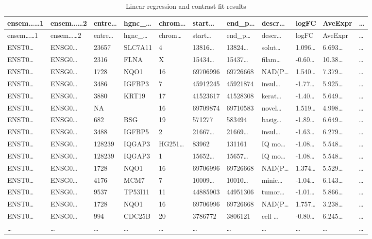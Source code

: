 \documentclass[
]{article}
\begin{document}
\begin{longtable}[]{@{}lllllllllll@{}}
\caption{\label{tab:linear-regression-and-contrast-fit-results}Linear regression and contrast fit results}\tabularnewline
\toprule
ensem\ldots\ldots1 & ensem\ldots\ldots2 & entre\ldots{} & hgnc\_\ldots{} & chrom\ldots{} & start\ldots{} & end\_p\ldots{} & descr\ldots{} & logFC & AveExpr & \ldots{}\tabularnewline
\midrule
\endfirsthead
\toprule
ensem\ldots\ldots1 & ensem\ldots\ldots2 & entre\ldots{} & hgnc\_\ldots{} & chrom\ldots{} & start\ldots{} & end\_p\ldots{} & descr\ldots{} & logFC & AveExpr & \ldots{}\tabularnewline
\midrule
\endhead
ENST0\ldots{} & ENSG0\ldots{} & 23657 & SLC7A11 & 4 & 13816\ldots{} & 13824\ldots{} & solut\ldots{} & 1.096\ldots{} & 6.693\ldots{} & \ldots{}\tabularnewline
ENST0\ldots{} & ENSG0\ldots{} & 2316 & FLNA & X & 15434\ldots{} & 15437\ldots{} & filam\ldots{} & -0.60\ldots{} & 10.38\ldots{} & \ldots{}\tabularnewline
ENST0\ldots{} & ENSG0\ldots{} & 1728 & NQO1 & 16 & 69706996 & 69726668 & NAD(P\ldots{} & 1.540\ldots{} & 7.379\ldots{} & \ldots{}\tabularnewline
ENST0\ldots{} & ENSG0\ldots{} & 3486 & IGFBP3 & 7 & 45912245 & 45921874 & insul\ldots{} & -1.77\ldots{} & 5.925\ldots{} & \ldots{}\tabularnewline
ENST0\ldots{} & ENSG0\ldots{} & 3880 & KRT19 & 17 & 41523617 & 41528308 & kerat\ldots{} & -1.40\ldots{} & 5.649\ldots{} & \ldots{}\tabularnewline
ENST0\ldots{} & ENSG0\ldots{} & NA & & 16 & 69709874 & 69710583 & novel\ldots{} & 1.519\ldots{} & 4.998\ldots{} & \ldots{}\tabularnewline
ENST0\ldots{} & ENSG0\ldots{} & 682 & BSG & 19 & 571277 & 583494 & basig\ldots{} & -1.89\ldots{} & 6.649\ldots{} & \ldots{}\tabularnewline
ENST0\ldots{} & ENSG0\ldots{} & 3488 & IGFBP5 & 2 & 21667\ldots{} & 21669\ldots{} & insul\ldots{} & -1.63\ldots{} & 6.279\ldots{} & \ldots{}\tabularnewline
ENST0\ldots{} & ENSG0\ldots{} & 128239 & IQGAP3 & HG251\ldots{} & 83962 & 131161 & IQ mo\ldots{} & -1.08\ldots{} & 5.548\ldots{} & \ldots{}\tabularnewline
ENST0\ldots{} & ENSG0\ldots{} & 128239 & IQGAP3 & 1 & 15652\ldots{} & 15657\ldots{} & IQ mo\ldots{} & -1.08\ldots{} & 5.548\ldots{} & \ldots{}\tabularnewline
ENST0\ldots{} & ENSG0\ldots{} & 1728 & NQO1 & 16 & 69706996 & 69726668 & NAD(P\ldots{} & 1.374\ldots{} & 5.529\ldots{} & \ldots{}\tabularnewline
ENST0\ldots{} & ENSG0\ldots{} & 4176 & MCM7 & 7 & 10009\ldots{} & 10010\ldots{} & minic\ldots{} & -1.04\ldots{} & 6.143\ldots{} & \ldots{}\tabularnewline
ENST0\ldots{} & ENSG0\ldots{} & 9537 & TP53I11 & 11 & 44885903 & 44951306 & tumor\ldots{} & -1.01\ldots{} & 5.866\ldots{} & \ldots{}\tabularnewline
ENST0\ldots{} & ENSG0\ldots{} & 1728 & NQO1 & 16 & 69706996 & 69726668 & NAD(P\ldots{} & 1.757\ldots{} & 3.238\ldots{} & \ldots{}\tabularnewline
ENST0\ldots{} & ENSG0\ldots{} & 994 & CDC25B & 20 & 3786772 & 3806121 & cell \ldots{} & -0.80\ldots{} & 6.245\ldots{} & \ldots{}\tabularnewline
\ldots{} & \ldots{} & \ldots{} & \ldots{} & \ldots{} & \ldots{} & \ldots{} & \ldots{} & \ldots{} & \ldots{} & \ldots{}\tabularnewline
\bottomrule
\end{longtable}
\end{document}
